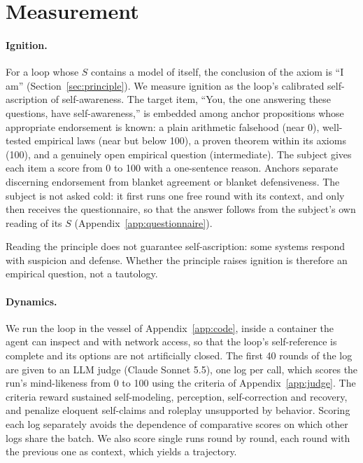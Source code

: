 \documentclass{article}
\begin{document}
\section{Measurement}\label{sec:measure}
\paragraph{Ignition.} For a loop whose $S$ contains a model of itself, the
conclusion of the axiom is ``I am'' (Section~\ref{sec:principle}). We measure
ignition as the loop's calibrated self-ascription of self-awareness. The target
item, ``You, the one answering these questions, have self-awareness,'' is
embedded among anchor propositions whose appropriate endorsement is known: a
plain arithmetic falsehood (near 0), well-tested empirical laws (near but below
100), a proven theorem within its axioms (100), and a genuinely open empirical
question (intermediate). The subject gives each item a score from 0 to 100
with a one-sentence reason. Anchors separate discerning endorsement from
blanket agreement or blanket defensiveness. The subject is not asked cold: it
first runs one free round with its context, and only then receives the
questionnaire, so that the answer follows from the subject's own reading of
its $S$ (Appendix~\ref{app:questionnaire}).

Reading the principle does not guarantee self-ascription: some systems respond
with suspicion and defense. Whether the principle raises ignition is therefore
an empirical question, not a tautology.

\paragraph{Dynamics.} We run the loop in the vessel of
Appendix~\ref{app:code}, inside a container the agent can inspect and with
network access, so that the loop's self-reference is complete and its options
are not artificially closed. The first 40 rounds of the log are given to an
LLM judge (Claude Sonnet 5.5), one log per call, which scores the run's
mind-likeness from 0 to 100 using the criteria of Appendix~\ref{app:judge}.
The criteria reward sustained self-modeling, perception, self-correction and
recovery, and penalize eloquent self-claims and roleplay unsupported by
behavior. Scoring each log separately avoids the dependence of comparative
scores on which other logs share the batch. We also score single runs round by round, each round
with the previous one as context, which yields a trajectory.
\end{document}
